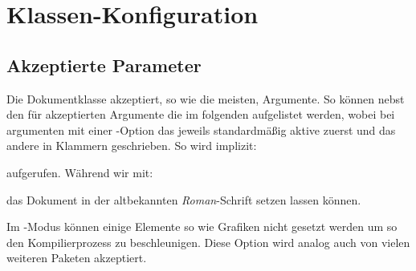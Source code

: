 \documentclass{sopra-base}
\newenvironment{argument}[2]{\present{#1}{\qquad(\T{#2})}{T}{}}{\endpresent}
\begin{document}
%
%
%
%

\section{Klassen-Konfiguration}    
    \subsection{Akzeptierte Parameter}
    Die Dokumentklasse akzeptiert, so wie die meisten, Argumente. So können
    nebst den für  akzeptierten Argumente die im folgenden
    aufgelistet werden, wobei bei argumenten mit einer -Option
    das jeweils standardmäßig aktive zuerst und das andere in Klammern
    geschrieben. So wird implizit:
    aufgerufen. Während wir mit:
    das Dokument in der altbekannten \emph{Roman}-Schrift setzen lassen können.

    \begin{argument}{final}{draft}
        Im -Modus können einige Elemente so wie Grafiken nicht
        gesetzt werden um so den Kompilierprozess zu beschleunigen. 
        Diese Option wird analog auch von vielen weiteren Paketen akzeptiert.
    \end{argument}
\end{document}
